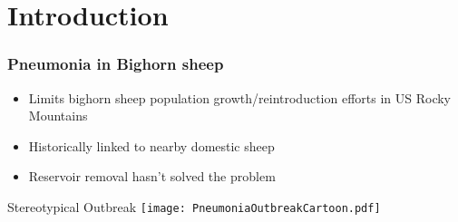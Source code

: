 \documentclass[fleqn,xcolor=table]{beamer}
\begin{document}
{

	\section{Introduction}
\begin{frame}[t]
	\frametitle{\color{darkred}Pneumonia in Bighorn sheep}
\begin{itemize}
\item \small {\color{navy}Limits bighorn sheep population growth/reintroduction efforts in
	US Rocky Mountains }
\item \small {\color{navy}Historically linked to nearby domestic sheep
}
\item \small {\color{navy} Reservoir removal hasn't solved the problem}

\end{itemize}

{\color{navy} Stereotypical Outbreak}
%
	\texttt{[image: PneumoniaOutbreakCartoon.pdf]}
%


\end{frame}
}
%
%
\end{document}
